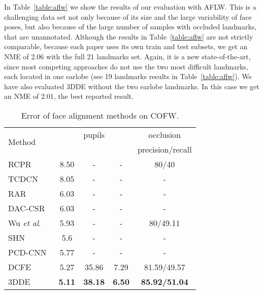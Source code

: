 \documentclass[11pt,twocolumn]{article}
\newcommand{\etal}{\textit{et al}.}
\begin{document}
In Table~\ref{table:aflw} we show the results of our evaluation with AFLW. This is a challenging data set not only because of its size and the large variability of face poses, but also because of the large number of samples with occluded landmarks, that are unannotated. 
Although the results in Table~\ref{table:aflw} are not strictly comparable, because each paper uses its own train and test subsets, we get an NME of 2.06 with the full 21 landmarks set. Again, it is a new state-of-the-art, since most competing approaches do not use the two most difficult landmarks, each located in one earlobe (see 19 landmarks results in Table~\ref{table:aflw}). We have also evaluated 3DDE without the two earlobe landmarks. In this case we get an NME of 2.01, the best reported result.

\begin{table*}
    \footnotesize
    \begin{center}
    \setlength\tabcolsep{1.25pt}
    \begin{tabular}{l|ccc|c}
    \hline
    \multirow{2}{*}{Method} & \multicolumn{3}{c|}{pupils} & occlusion\\
    &  &  &  & precision/recall\\
    \hline
RCPR~\citep{Burgos13} & 8.50 & - & - & 80/40\\
    TCDCN~\citep{Zhang14b} & 8.05 & - & - & -\\
    RAR~\citep{Xiao16} & 6.03 & - & - & -\\
    DAC-CSR~\citep{Feng17} & 6.03 & - & - & -\\
    Wu \etal~\citep{Wu15} & 5.93 & - & - & 80/49.11\\
    SHN~\citep{Yang17} & 5.6 & - & - & -\\
    PCD-CNN~\citep{Kumar18a} & 5.77 & - & - & -\\
    DCFE~\citep{Valle18} & 5.27 & 35.86 & 7.29 & 81.59/49.57\\
    \hline
    3DDE & \textbf{5.11} & \textbf{38.18} & \textbf{6.50} & \textbf{85.92/51.04}\\
    \hline
    \end{tabular}
    \end{center}
    \caption{Error of face alignment methods on COFW.}
    \label{table:cofw}
\end{table*}
\end{document}
